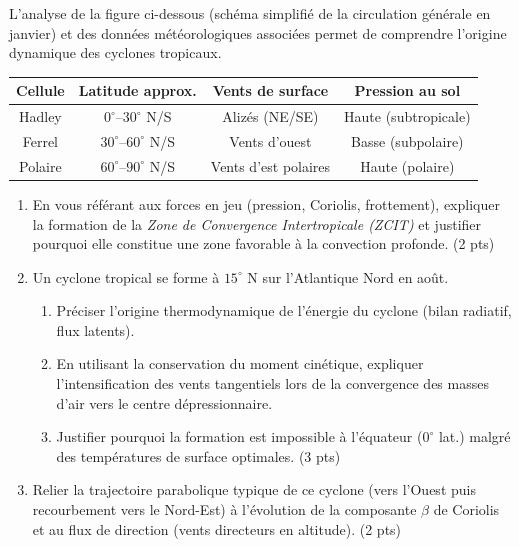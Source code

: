 \documentclass[11pt]{article}
\begin{document}
\begin{exercice}
L'analyse de la figure ci-dessous (schéma simplifié de la circulation générale en janvier) et des données météorologiques associées permet de comprendre l'origine dynamique des cyclones tropicaux.

\begin{center}
\begin{tabular}{|c|c|c|c|}
\hline
\textbf{Cellule} & \textbf{Latitude approx.} & \textbf{Vents de surface} & \textbf{Pression au sol} \\
\hline
Hadley & $0^\circ$--$30^\circ$ N/S & Alizés (NE/SE) & Haute (subtropicale) \\
\hline
Ferrel & $30^\circ$--$60^\circ$ N/S & Vents d'ouest & Basse (subpolaire) \\
\hline
Polaire & $60^\circ$--$90^\circ$ N/S & Vents d'est polaires & Haute (polaire) \\
\hline
\end{tabular}
\end{center}

\begin{enumerate}
\item En vous référant aux forces en jeu (pression, Coriolis, frottement), expliquer la formation de la \textit{Zone de Convergence Intertropicale (ZCIT)} et justifier pourquoi elle constitue une zone favorable à la convection profonde. (2 pts)
\item Un cyclone tropical se forme à $15^\circ$ N sur l'Atlantique Nord en août. 
\begin{enumerate}
\item Préciser l'origine thermodynamique de l'énergie du cyclone (bilan radiatif, flux latents). 
\item En utilisant la conservation du moment cinétique, expliquer l'intensification des vents tangentiels lors de la convergence des masses d'air vers le centre dépressionnaire. 
\item Justifier pourquoi la formation est impossible à l'équateur ($0^\circ$ lat.) malgré des températures de surface optimales. (3 pts)
\end{enumerate}
\item Relier la trajectoire parabolique typique de ce cyclone (vers l'Ouest puis recourbement vers le Nord-Est) à l'évolution de la composante $\beta$ de Coriolis et au flux de direction (vents directeurs en altitude). (2 pts)
\end{enumerate}
\end{exercice}
\end{document}
